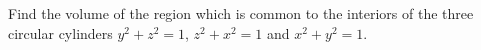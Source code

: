 Find the volume of the region which is common to the interiors of the three
circular cylinders $y^2 + z^2 = 1$, $z^2 + x^2 = 1$ and $x^2 + y^2 = 1$.

